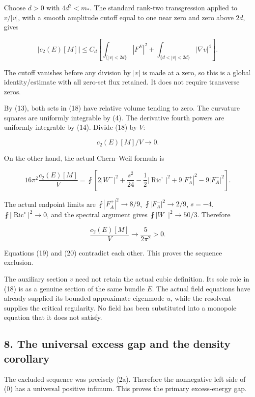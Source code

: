 \documentclass[11pt]{article}
\begin{document}
Choose \(d>0\) with \(4d^2<m_*\). The standard rank-two transgression
applied to \(v/|v|\), with a smooth amplitude cutoff equal to one near
zero and zero above \(2d\), gives

\[
 |c_2(E)[M]|
 \le C_d\left[
 \int_{\{|v|<2d\}}|F^E|^2+
 \int_{\{d<|v|<2d\}}|\nabla v|^4\right].
\tag{18}
\]

The cutoff vanishes before any division by \(|v|\) is made at a zero, so
this is a global identity/estimate with all zero-set flux retained. It
does not require transverse zeros.

By (13), both sets in (18) have relative volume tending to zero. The
curvature squares are uniformly integrable by (4). The derivative fourth
powers are uniformly integrable by (14). Divide (18) by \(V\):

\[
 \boxed{c_2(E)[M]/V\longrightarrow0.}\tag{19}
\]

On the other hand, the actual Chern--Weil formula is

\[
 16\pi^2\frac{c_2(E)[M]}V
 =\fint\left[
 2|W^-|^2+\frac{s^2}{24}
 -\frac12|\operatorname{Ric}^{\circ}|^2
 +9|F_A^+|^2-9|F_A^-|^2\right].
\]

The actual endpoint limits are \(\fint|F_A^+|^2\to8/9\),
\(\fint|F_A^-|^2\to2/9\), \(s=-4\),
\(\fint|\operatorname{Ric}^{\circ}|^2\to0\), and the spectral argument
gives \(\fint|W^-|^2\to50/3\). Therefore

\[
 \boxed{\frac{c_2(E)[M]}V\longrightarrow
                   \frac{5}{2\pi^2}>0.}\tag{20}
\]

Equations (19) and (20) contradict each other. This proves the sequence
exclusion.

The auxiliary section \(v\) need not retain the actual cubic definition.
Its sole role in (18) is as a genuine section of the same bundle \(E\).
The actual field equations have already supplied its bounded approximate
eigenmode \(u\), while the resolvent supplies the critical regularity.
No field has been substituted into a monopole equation that it does not
satisfy.

\hypertarget{o10strength:the-universal-excess-gap-and-the-density-corollary}{%
\subsection{8. The universal excess gap and the density
corollary}\label{o10strength:the-universal-excess-gap-and-the-density-corollary}}

The excluded sequence was precisely (2a). Therefore the nonnegative left
side of (0) has a universal positive infimum. This proves the primary
excess-energy gap.
\end{document}
